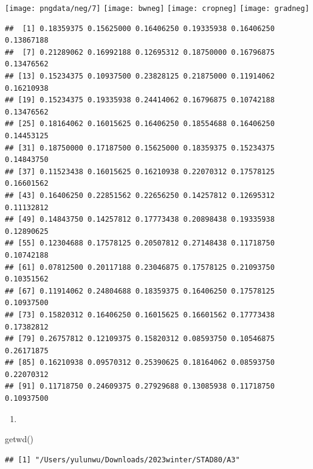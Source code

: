 \documentclass[
]{article}
\newenvironment{Shaded}{\begin{snugshade}}{\end{snugshade}}
\newcommand{\FunctionTok}[1]{\textcolor[rgb]{0.00,0.00,0.00}{#1}}
\newcommand{\NormalTok}[1]{#1}
\providecommand{\tightlist}{%
  \setlength{\itemsep}{0pt}\setlength{\parskip}{0pt}}
\begin{document}
\texttt{[image: pngdata/neg/7]}
\texttt{[image: bwneg]}
\texttt{[image: cropneg]}
\texttt{[image: gradneg]}

\begin{verbatim}
##  [1] 0.18359375 0.15625000 0.16406250 0.19335938 0.16406250 0.13867188
##  [7] 0.21289062 0.16992188 0.12695312 0.18750000 0.16796875 0.13476562
## [13] 0.15234375 0.10937500 0.23828125 0.21875000 0.11914062 0.16210938
## [19] 0.15234375 0.19335938 0.24414062 0.16796875 0.10742188 0.13476562
## [25] 0.18164062 0.16015625 0.16406250 0.18554688 0.16406250 0.14453125
## [31] 0.18750000 0.17187500 0.15625000 0.18359375 0.15234375 0.14843750
## [37] 0.11523438 0.16015625 0.16210938 0.22070312 0.17578125 0.16601562
## [43] 0.16406250 0.22851562 0.22656250 0.14257812 0.12695312 0.11132812
## [49] 0.14843750 0.14257812 0.17773438 0.20898438 0.19335938 0.12890625
## [55] 0.12304688 0.17578125 0.20507812 0.27148438 0.11718750 0.10742188
## [61] 0.07812500 0.20117188 0.23046875 0.17578125 0.21093750 0.10351562
## [67] 0.11914062 0.24804688 0.18359375 0.16406250 0.17578125 0.10937500
## [73] 0.15820312 0.16406250 0.16015625 0.16601562 0.17773438 0.17382812
## [79] 0.26757812 0.12109375 0.15820312 0.08593750 0.10546875 0.26171875
## [85] 0.16210938 0.09570312 0.25390625 0.18164062 0.08593750 0.22070312
## [91] 0.11718750 0.24609375 0.27929688 0.13085938 0.11718750 0.10937500
\end{verbatim}

\begin{enumerate}
\def\labelenumi{(\alph{enumi})}
\setcounter{enumi}{1}
\tightlist
\item
\end{enumerate}

\begin{Shaded}
\begin{Highlighting}[]
\FunctionTok{getwd}\NormalTok{()}
\end{Highlighting}
\end{Shaded}

\begin{verbatim}
## [1] "/Users/yulunwu/Downloads/2023winter/STAD80/A3"
\end{verbatim}
\end{document}
